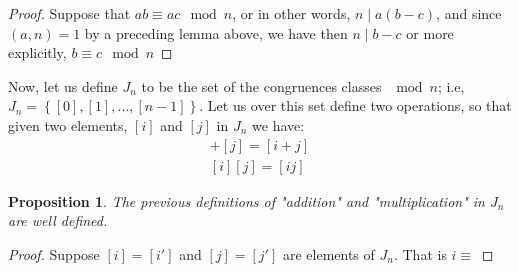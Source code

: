 \documentclass[11pt,a4paper]{article}
\newtheorem{claim}{Proposition}
\begin{document}
\begin{proof}
	Suppose that $ ab \equiv ac \mod{n}  $, or in other words, $ n \mid a (b-c)$, and since $(a,n) = 1$ by a preceding lemma above, we have then $ n \mid b -c $ or more explicitly, $ b \equiv c \mod{n}$ 
\end{proof}
Now, let us define $J_n$ to be the set of the congruences classes $ \mod{n}$; i.e, $ J_n = \left\lbrace [0],[1], \ldots, [n-1] \right\rbrace $. Let us over this set define two operations, so that given two elements, $[i]$ and $[j]$ in $ J_n$ we have:
\begin{align*}
[i] + [j] = [i+j] \\
[i][j] = [ij]
\end{align*}
\begin{claim}
	The previous definitions of "addition" and "multiplication" in $J_n$ are well defined.
\end{claim}
\begin{proof}
	Suppose $[i] = [i'] $ and $[j] = [j'] $ are elements of $J_n$. That is $ i \equiv $
\end{proof}
\end{document}
